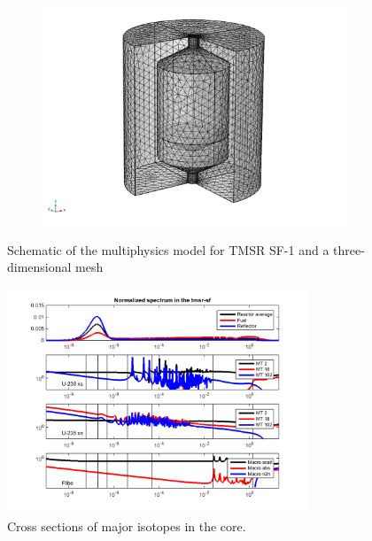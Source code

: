 \documentclass{elsarticle}
\begin{document}
\begin{figure}[h]
\begin{subfigure}{0.55\textwidth}
    \includegraphics[width = \columnwidth]{./images/diffusion/tmsr/finer.png}
  \end{subfigure}
  \caption{Schematic of the multiphysics model for TMSR SF-1 and a three-dimensional mesh}
  \label{fig:model_geom}
\end{figure}


 
\begin{figure}[h]
  \centering
  \includegraphics[width=0.8\textwidth]{./images/diffusion/tmsr/isotope_XS.png}
  \caption{Cross sections of major isotopes in the core.}
  \label{fig:xs_isotope}
\end{figure}
\end{document}
